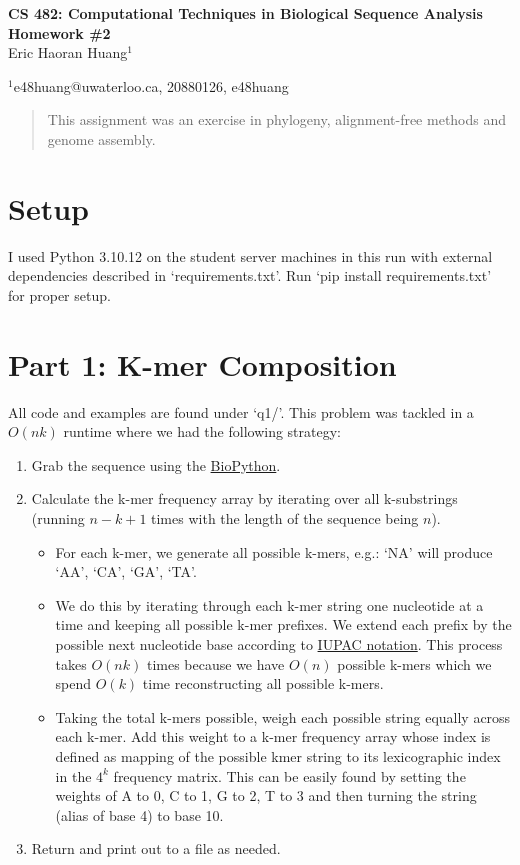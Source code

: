 \documentclass[10pt]{article}
\begin{document}
\baselineskip 12pt

\begin{center}
\textbf{\Large CS 482: Computational Techniques in Biological Sequence Analysis Homework \#2}\\

\vspace{0.5cc}
{ \sc Eric Haoran Huang$^{1}$}\\

\vspace{0.2 cm}

{\small $^{1}$e48huang@uwaterloo.ca, 20880126, e48huang}
 \end{center}

\begin{abstract}
  \noindent This assignment was an exercise in phylogeny, alignment-free methods and genome assembly.
\end{abstract}
\section*{Setup}
I used Python 3.10.12 on the student server machines in this run with external dependencies described in `requirements.txt'. Run `pip install requirements.txt' for proper setup.

\section*{Part 1: K-mer Composition}
All code and examples are found under `q1/'. This problem was tackled in a $O(nk)$ runtime where we had the following strategy:

\begin{enumerate}
  \item Grab the sequence using the \href{https://biopython.org/wiki/SeqIO}{BioPython}.
  \item Calculate the k-mer frequency array by iterating over all k-substrings (running $n - k + 1$ times with the length of the sequence being $n$).
  \begin{itemize}
    \item For each k-mer, we generate all possible k-mers, e.g.: `NA' will produce `AA', `CA', `GA', `TA'.
    \item We do this by iterating through each k-mer string one nucleotide at a time and keeping all possible k-mer prefixes. We extend each prefix by the possible next nucleotide base according to \href{https://en.wikipedia.org/wiki/Nucleic_acid_notation}{IUPAC notation}. This process takes $O(nk)$ times because we have $O(n)$ possible k-mers which we spend $O(k)$ time reconstructing all possible k-mers.
    \item Taking the total k-mers possible, weigh each possible string equally across each k-mer. Add this weight to a k-mer frequency array whose index is defined as mapping of the possible kmer string to its lexicographic index in the $4^k$ frequency matrix. This can be easily found by setting the weights of A to 0, C to 1, G to 2, T to 3 and then turning the string (alias of base 4) to base 10.
  \end{itemize}
  \item Return and print out to a file as needed.
\end{enumerate}
\end{document}
